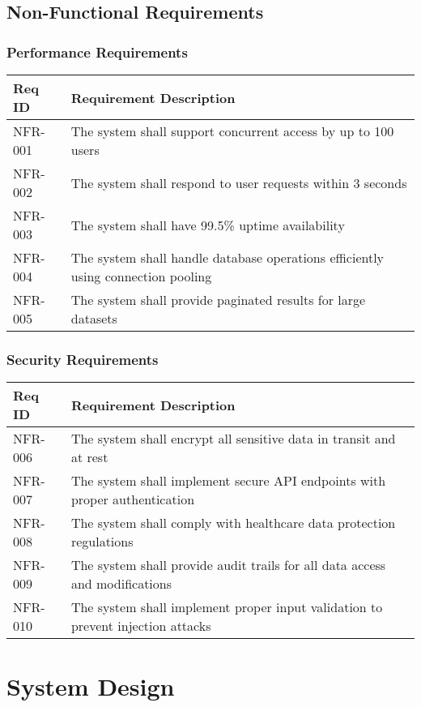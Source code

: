\documentclass[12pt,a4paper]{article}
\begin{document}
\subsection{Non-Functional Requirements}

\subsubsection{Performance Requirements}
\begin{longtable}{|p{2cm}|p{12cm}|}
\hline
\textbf{Req ID} & \textbf{Requirement Description} \\
\hline
NFR-001 & The system shall support concurrent access by up to 100 users \\
\hline
NFR-002 & The system shall respond to user requests within 3 seconds \\
\hline
NFR-003 & The system shall have 99.5\% uptime availability \\
\hline
NFR-004 & The system shall handle database operations efficiently using connection pooling \\
\hline
NFR-005 & The system shall provide paginated results for large datasets \\
\hline
\end{longtable}

\subsubsection{Security Requirements}
\begin{longtable}{|p{2cm}|p{12cm}|}
\hline
\textbf{Req ID} & \textbf{Requirement Description} \\
\hline
NFR-006 & The system shall encrypt all sensitive data in transit and at rest \\
\hline
NFR-007 & The system shall implement secure API endpoints with proper authentication \\
\hline
NFR-008 & The system shall comply with healthcare data protection regulations \\
\hline
NFR-009 & The system shall provide audit trails for all data access and modifications \\
\hline
NFR-010 & The system shall implement proper input validation to prevent injection attacks \\
\hline
\end{longtable}

\section{System Design}
\end{document}
